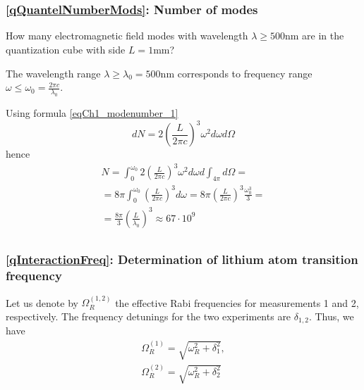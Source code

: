 \chapter{}

\section{} 

\subsection{\ref{qQuantelNumberMods}: Number of modes}
How many electromagnetic field modes with wavelength
  $\lambda \ge 500 \mbox{nm}$ are in the quantization cube with side
$L=1 \mbox{mm}$?

The wavelength range $\lambda \ge \lambda_0 = 500 \mbox{nm}$
corresponds to frequency range
$\omega \le \omega_0 = \frac{2 \pi c}{\lambda_0}$.

Using formula \ref{eqCh1_modenumber_1}
\[
d N = 2 \left(\frac{L}{2 \pi c} \right)^3 \omega^2 d \omega d \Omega
\]
hence
\begin{eqnarray}
  N = \int_0^{\omega_0} 2 \left(\frac{L}{2 \pi c} \right)^3 \omega^2 d
  \omega d \int_{4 \pi} d \Omega =
  \nonumber \\
  = 8 \pi \int_0^{\omega_0} \left(\frac{L}{2 \pi c} \right)^3 d \omega
  = 8 \pi \left(\frac{L}{2 \pi c}\right)^3 \frac{\omega_0^3}{3} =
  \nonumber \\
  = \frac{8 \pi}{3} \left(\frac{L}{\lambda_0}\right)^3 \approx 67
  \cdot 10^9
  \nonumber
\end{eqnarray}


\section{}

\subsection{\ref{qInteractionFreq}: Determination of lithium atom transition frequency} 

%

Let us denote by $\Omega_R^{(1,2)}$ the effective Rabi frequencies for
measurements 1 and 2, respectively. The frequency detunings for the two
experiments are $\delta_{1,2}$. Thus, we have
\begin{eqnarray}
  \Omega_R^{(1)} = \sqrt{\omega_R^2 + \delta_1^2},
  \nonumber \\
  \Omega_R^{(2)} = \sqrt{\omega_R^2 + \delta_2^2}
  \label{eqAnswersInteraction40}
\end{eqnarray}

